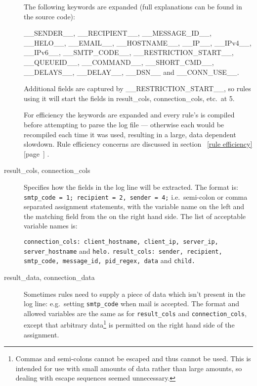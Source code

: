 \documentclass[a4paper,12pt,draft]{article}
\newcommand{\refwithpage}[1]{%
    \empty{}\ref{#1} [page~\pageref{#1}]%
}
\begin{document}
\begin{description}
        The following keywords are expanded (full explanations can be found
        in the source code):

        \_\_SENDER\_\_, \_\_RECIPIENT\_\_, \_\_MESSAGE\_ID\_\_,
        \_\_HELO\_\_, \newline \_\_EMAIL\_\_, \_\_HOSTNAME\_\_, \_\_IP\_\_,
        \_\_IPv4\_\_, \_\_IPv6\_\_, \newline \_\_SMTP\_CODE\_\_,
        \_\_RESTRICTION\_START\_\_, \_\_QUEUEID\_\_, \newline
        \_\_COMMAND\_\_, \_\_SHORT\_CMD\_\_, \_\_DELAYS\_\_, \_\_DELAY\_\_,
        \_\_DSN\_\_ and \_\_CONN\_USE\_\_.

        Additional fields are captured by \_\_RESTRICTION\_START\_\_, so
        rules using it will start the fields in result\_cols,
        connection\_cols, etc.\ at 5.

        For efficiency the keywords are expanded and every rule's \regex{}
        is compiled before attempting to parse the log file --- otherwise
        each \regex{} would be recompiled each time it was used, resulting
        in a large, data dependent slowdown.  Rule efficiency concerns are
        discussed in section~\refwithpage{rule efficiency}.

    \item [result\_cols, connection\_cols] Specifies how the fields in the
        log line will be extracted.  The format is: \newline
        \texttt{smtp\_code = 1; recipient = 2, sender = 4;} \newline i.e.\
        semi-colon or comma separated assignment statements, with the
        variable name on the left and the matching field from the \regex{}
        on the right hand side.  The list of acceptable variable names is:

        \texttt{connection\_cols: client\_hostname, client\_ip, server\_ip,
        \newline \hspace*{2em} server\_hostname} and \texttt{helo.\newline}
        \texttt{result\_cols: sender, recipient, smtp\_code, message\_id,
        \newline \hspace*{2em} pid\_regex, data} and \texttt{child.}

    \item [result\_data, connection\_data] Sometimes rules need to supply a
        piece of data which isn't present in the log line: e.g.\ setting
        \texttt{smtp\_code} when mail is accepted.  The format and allowed
        variables are the same as for \texttt{result\_cols} and
        \texttt{connection\_cols}, except that arbitrary
        data\footnote{Commas and semi-colons cannot be escaped and thus
        cannot be used.  This is intended for use with small amounts of
        data rather than large amounts, so dealing with escape sequences
        seemed unnecessary.} is permitted on the right hand side of the
        assignment.


\end{description}
\end{document}
